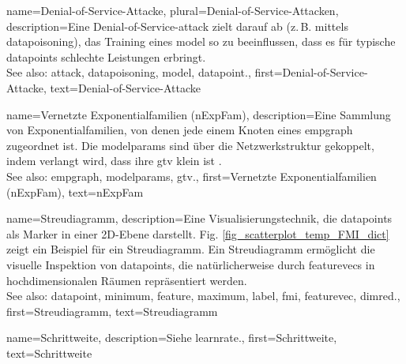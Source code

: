 {{{{
{name={Denial-of-Service-Attacke}, plural={Denial-of-Service-Attacken},
	description={Eine Denial-of-Service-\gls{attack} zielt darauf ab (z. B. mittels \gls{datapoisoning}), 
		das Training eines \gls{model} so zu beeinflussen, dass es für typische \glspl{datapoint} schlechte Leistungen erbringt.
		\\
		See also: \gls{attack}, \gls{datapoisoning}, \gls{model}, \gls{datapoint}.},
	first={Denial-of-Service-Attacke},
	text={Denial-of-Service-Attacke} 
}

{name={Vernetzte Exponentialfamilien (nExpFam)}, 
	description={Eine Sammlung von Exponentialfamilien, von denen jede einem Knoten eines \gls{empgraph} zugeordnet ist. 
		Die \glspl{modelparam} sind über die Netzwerkstruktur gekoppelt, indem verlangt wird, dass ihre \gls{gtv} klein ist \cite{JungNetExp2020}.
		\\
		See also: \gls{empgraph}, \glspl{modelparam}, \gls{gtv}.},
	first={Vernetzte Exponentialfamilien (nExpFam)},
	text={nExpFam} 
}

{name={Streudiagramm}, 
	description={Eine Visualisierungstechnik, die \glspl{datapoint} als Marker in einer 2D-Ebene darstellt. 
		Fig. \ref{fig_scatterplot_temp_FMI_dict} zeigt ein Beispiel für ein Streudiagramm.  
		Ein Streudiagramm ermöglicht die visuelle Inspektion von \glspl{datapoint}, die natürlicherweise durch \glspl{featurevec} in hochdimensionalen Räumen repräsentiert werden.
		\\
		See also: \gls{datapoint}, \gls{minimum}, \gls{feature}, \gls{maximum}, \gls{label}, \gls{fmi}, \gls{featurevec}, \gls{dimred}.},
	first={Streudiagramm},
	text={Streudiagramm} 
}

{name={Schrittweite}, 
	description={Siehe \gls{learnrate}.}, 
	first={Schrittweite},
	text={Schrittweite} 
}

}}}}
